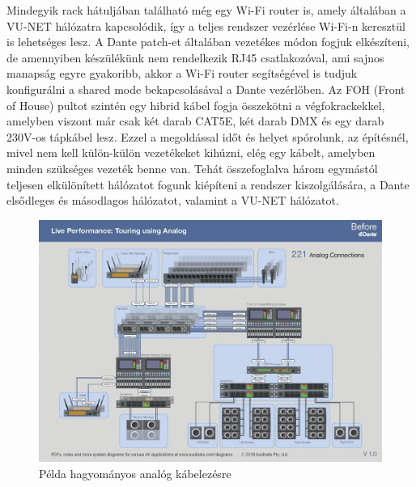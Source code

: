 Mindegyik rack hátuljában található még egy Wi-Fi router is, amely általában a VU-NET hálózatra kapcsolódik,
így a teljes rendszer vezérlése Wi-Fi-n keresztül is lehetséges lesz.
A Dante patch-et általában vezetékes módon fogjuk elkészíteni, de amennyiben készülékünk nem rendelkezik RJ45 csatlakozóval,
ami sajnos manapság egyre gyakoribb, akkor a Wi-Fi router segítségével is tudjuk konfigurálni a shared mode bekapcsolásával 
a Dante vezérlőben.
Az FOH (Front of House) pultot szintén egy hibrid kábel fogja összekötni a végfokrackekkel, amelyben viszont
már csak két darab CAT5E, két darab DMX és egy darab 230V-os tápkábel lesz. Ezzel a megoldással időt és helyet spórolunk,
az építésnél, mivel nem kell külön-külön vezetékeket kihúzni, elég egy kábelt, amelyben minden szükséges vezeték benne van.
Tehát összefoglalva három egymástól teljesen elkülönített hálózatot fogunk kiépíteni a rendszer kiszolgálására,
a Dante elsődleges és másodlagos hálózatot, valamint a VU-NET hálózatot.
\begin{figure}[H]
	\centering
	\includegraphics[width=\linewidth, keepaspectratio]{figures/live-analog.jpg}
	\caption{Példa hagyományos analóg kábelezésre~\cite{APPLICATIONDIAGRAMSFORDANTESYSTEMS}}\label{fig:live-analog}
\end{figure}
